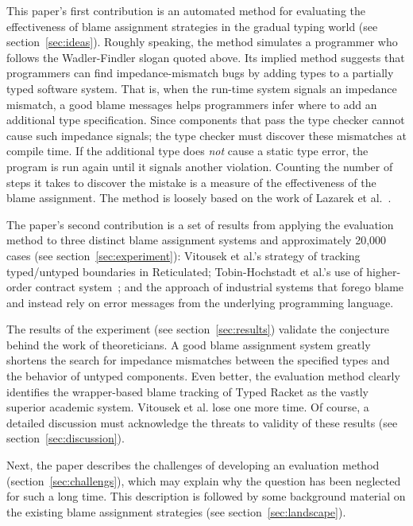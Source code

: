 This paper's first contribution is an automated method for evaluating the
effectiveness of blame assignment strategies in the gradual typing world (see
section~\ref{sec:ideas}). Roughly speaking, the method simulates a programmer who
follows the Wadler-Findler slogan quoted above. Its implied method suggests that
programmers can find impedance-mismatch bugs by adding types to a partially typed
software system. That is, when the run-time system signals an impedance mismatch,
a good blame messages helps programmers infer where to add an additional type
specification. Since components that pass the type checker cannot cause such
impedance signals; the type checker must discover these mismatches at compile
time.  If the additional type does {\em not\/} cause a static type error, the
program is run again until it signals another violation.  Counting the number of
steps it takes to discover the mistake is a measure of the effectiveness of the
blame assignment.  The method is loosely based on the work of Lazarek et
al.~\cite{lksfd-popl-2020}. 

The paper's second contribution is a set of results from applying the evaluation
method to three distinct blame assignment systems and approximately 20,000
cases (see section~\ref{sec:experiment}): Vitousek et
al.'s strategy of tracking typed/untyped boundaries in Reticulated;
Tobin-Hochstadt et al.'s use of higher-order contract system~\cite{ff-icfp-2002,
mf-toplas-2009}; and the approach of industrial systems that forego blame
and instead rely on error messages from the
underlying programming language.


The results of the experiment (see section~\ref{sec:results}) validate the
conjecture behind the work of theoreticians. A good blame assignment system
greatly shortens the search for impedance mismatches between the specified types
and the behavior of untyped components. Even better, the evaluation method clearly
identifies the wrapper-based blame tracking of Typed Racket as the vastly superior
academic system. Vitousek et al. lose one more time. Of course, a detailed
discussion must acknowledge the threats to validity of these results (see
section~\ref{sec:discussion}).

Next, the paper describes the challenges of developing an evaluation method
(section~\ref{sec:challengs}), which may explain why the question has been neglected
for such a long time. This description is followed by some background material on the
existing blame assignment strategies (see section~\ref{sec:landscape}).


